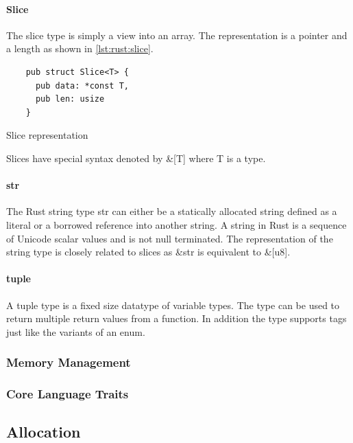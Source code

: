 \paragraph{Slice}

The slice type is simply a view into an array.
The representation is a pointer and a length as shown in \autoref{lst:rust:slice}.

\begin{listing}[H]
  \begin{verbatim}
    pub struct Slice<T> {
      pub data: *const T,
      pub len: usize
    }
\end{verbatim}
\caption{Slice representation}
\label{lst:rust:slice}
\end{listing}

Slices have special syntax denoted by \&[T] where T is a type.

\paragraph{str}
\label{par:rust:str}

The Rust string type str can either be a statically allocated string defined as a literal or a borrowed reference into another string.
A string in Rust is a sequence of Unicode scalar values and is not null terminated.
The representation of the string type is closely related to slices as \&str is equivalent to \&[u8].

\paragraph{tuple}

A tuple type is a fixed size datatype of variable types.
The type can be used to return multiple return values from a function.
In addition the type supports tags just like the variants of an enum.

\subsubsection{Memory Management}
\subsubsection{Core Language Traits}

\subsection{Allocation}
\label{sec:rust:allocation}


